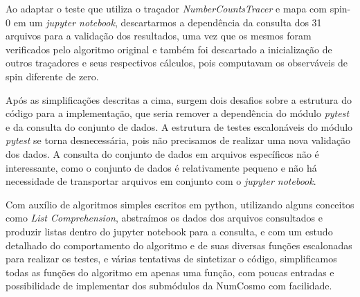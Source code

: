 Ao adaptar o teste que utiliza o traçador \textit{NumberCountsTracer} e mapa com spin-0 em um \textit{jupyter notebook}, descartarmos a dependência da consulta dos 31 arquivos para a validação dos resultados, uma vez que os mesmos foram verificados pelo algoritmo original e também foi descartado a inicialização de outros traçadores e seus respectivos cálculos, pois computavam os observáveis de spin diferente de zero.
 
Após as simplificações descritas a cima, surgem dois desafios sobre a estrutura do código para a implementação, que seria remover a dependência do módulo \textit{pytest} e da consulta do conjunto de dados. A estrutura de testes escalonáveis do módulo \textit{pytest} se torna desnecessária, pois não precisamos de realizar uma nova validação dos dados. A consulta do conjunto de dados em arquivos específicos não é interessante, como o conjunto de dados é relativamente pequeno e não há necessidade de transportar arquivos em conjunto com o \textit{jupyter notebook}.

Com auxílio de algoritmos simples escritos em python, utilizando alguns conceitos como \textit{List Comprehension}, abstraímos os dados dos arquivos consultados e produzir listas dentro do jupyter notebook para a consulta, e com um estudo detalhado do comportamento do algoritmo e de suas diversas funções escalonadas para realizar os testes, e várias tentativas de sintetizar o código, simplificamos todas as funções do algoritmo em apenas uma função, com poucas entradas e possibilidade de implementar dos submódulos da NumCosmo com facilidade.







 













